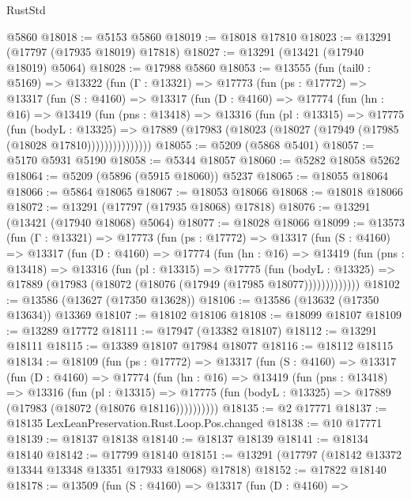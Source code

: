 \begin{lexlean}{RustStd}
\begin{coremodule}
    @5860
@18018 := @5153 @5860
@18019 := @18018 @17810
@18023 := @13291 (@17797 (@17935 @18019) @17818)
@18027 := @13291 (@13421 (@17940 @18019) @5064)
@18028 := @17988 @5860
@18053 := @13555
    (fun (tail0 : @5169) =>
    @13322
      (fun (Γ : @13321) =>
      @17773
        (fun (ps : @17772) =>
        @13317
          (fun (S : @4160) =>
          @13317
            (fun (D : @4160) =>
            @17774
              (fun (hn : @16) =>
              @13419
                (fun (pns : @13418) =>
                @13316
                  (fun (pl : @13315) =>
                  @17775
                    (fun (bodyL : @13325) =>
                    @17889 (@17983 (@18023 (@18027 (@17949 (@17985 (@18028 @17810)))))))))))))))
@18055 := @5209 (@5868 @5401)
@18057 := @5170 @5931 @5190
@18058 := @5344 @18057
@18060 := @5282 @18058 @5262
@18064 := @5209 (@5896 (@5915 @18060)) @5237
@18065 := @18055 @18064
@18066 := @5864 @18065
@18067 := @18053 @18066
@18068 := @18018 @18066
@18072 := @13291 (@17797 (@17935 @18068) @17818)
@18076 := @13291 (@13421 (@17940 @18068) @5064)
@18077 := @18028 @18066
@18099 := @13573
    (fun (Γ : @13321) =>
    @17773
      (fun (ps : @17772) =>
      @13317
        (fun (S : @4160) =>
        @13317
          (fun (D : @4160) =>
          @17774
            (fun (hn : @16) =>
            @13419
              (fun (pns : @13418) =>
              @13316
                (fun (pl : @13315) =>
                @17775
                  (fun (bodyL : @13325) =>
                  @17889 (@17983 (@18072 (@18076 (@17949 (@17985 @18077)))))))))))))
@18102 := @13586 (@13627 (@17350 @13628))
@18106 := @13586 (@13632 (@17350 @13634)) @13369
@18107 := @18102 @18106
@18108 := @18099 @18107
@18109 := @13289 @17772
@18111 := @17947 (@13382 @18107)
@18112 := @13291 @18111
@18115 := @13389 @18107 @17984 @18077
@18116 := @18112 @18115
@18134 := @18109
    (fun (ps : @17772) =>
    @13317
      (fun (S : @4160) =>
      @13317
        (fun (D : @4160) =>
        @17774
          (fun (hn : @16) =>
          @13419
            (fun (pns : @13418) =>
            @13316
              (fun (pl : @13315) =>
              @17775 (fun (bodyL : @13325) => @17889 (@17983 (@18072 (@18076 @18116))))))))))
@18135 := @2 @17771
@18137 := @18135 LexLeanPreservation.Rust.Loop.Pos.changed
@18138 := @10 @17771
@18139 := @18137 @18138
@18140 := @18137 @18139
@18141 := @18134 @18140
@18142 := @17799 @18140
@18151 := @13291 (@17797 (@18142 @13372 @13344 @13348 @13351 @17933 @18068) @17818)
@18152 := @17822 @18140
@18178 := @13509
    (fun (S : @4160) =>
    @13317
      (fun (D : @4160) =>

\end{coremodule}
\end{lexlean}

